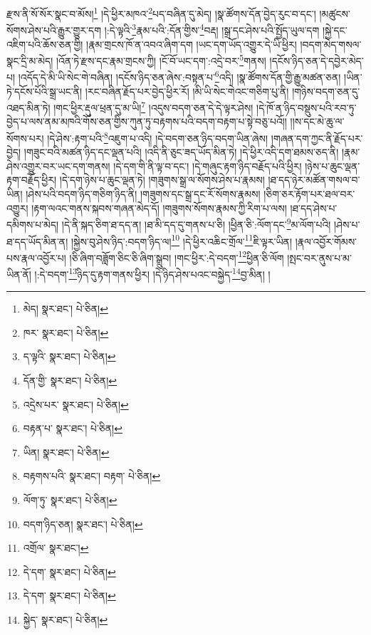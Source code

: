 རྫས་ནི་སོ་སོར་སྣང་བ་མོས།\footnote{མེད།  སྣར་ཐང་།  པེ་ཅིན། } །དེ་ཕྱིར་མཁའ་\footnote{ཁར་  སྣར་ཐང་།  པེ་ཅིན། }པད་བཞིན་དུ་མེད། །སྣ་ཚོགས་དོན་བྱེད་རུང་བ་དང་། །མཚུངས་སོགས་ཤེས་པའི་རྒྱུར་གྱུར་དག །:དེ་ལྟའི་\footnote{ད་ལྟའི་  སྣར་ཐང་།  པེ་ཅིན། }རྣམ་པའི་:དོན་གྱིས་\footnote{དོན་གྱི་  སྣར་ཐང་།  པེ་ཅིན། }བརྡ། །སྒྲ་དང་ཤེས་པའི་སྤྱོད་ཡུལ་དག །སྐྱེ་དང་འཇིག་པའི་ཆོས་ཅན་གྱི། །རྣམ་གྲངས་ཁོ་ན་འབའ་ཞིག་དག །ཡང་དག་ཡོད་འགྱུར་དེ་ཡི་ཕྱིར། །བདག་མེད་གསལ་སྣང་དྲི་མ་མེད། །འོན་ཏེ་རྫས་དང་རྣམ་གྲངས་ཀྱི། །ངོ་བོ་ཡང་དག་:འདྲེ་བར་\footnote{འདྲེས་པར་  སྣར་ཐང་།  པེ་ཅིན། }གནས། །དངོས་ཉིད་ཅན་དེ་དབྱེར་མེད་པ། །འདོད་དེ་མི་ཡི་སེང་གེ་བཞིན། །དངོས་ཉིད་ཅན་ཞེས་:བསྟན་པ་\footnote{བརྟན་པ་  སྣར་ཐང་།  པེ་ཅིན། }འདི། །སྣ་ཚོགས་དོན་གྱི་རྒྱུ་མཚན་ཅན། །ཡིན་ཏེ་དངོས་པོའི་སྒྲ་ཡང་ནི། །རང་བཞིན་རྗོད་པར་བྱེད་ཕྱིར་རོ། །མི་ཡི་སེང་གེའང་གཅིག་པུ་ནི། །གཉིས་བདག་ཅན་དུ་འཐད་མིན་ཏེ། །གང་ཕྱིར་རྡུལ་ཕྲན་དུ་མ་ཡི།\footnote{ཡིན།  སྣར་ཐང་།  པེ་ཅིན། } །འདུས་བདག་ཅན་དེ་དེ་ལྟར་ཤེས། །དེ་ཁོ་ན་ཉིད་བསྡུས་པའི་རབ་ཏུ་བྱེད་པ་ལས་ནམ་མཁའི་གོས་ཅན་གྱིས་ཀུན་ཏུ་བརྟགས་པའི་བདག་བརྟག་པ་སྟེ་བཅུ་པའོ།། །།ས་དང་མེ་ཆུ་ལ་སོགས་པར། །དེ་ཤེས་:རྟག་པའི་\footnote{བརྟགས་པའི་  སྣར་ཐང་། བརྟག་  པེ་ཅིན། }འཇུག་པ་འདི། །དེ་བདག་ཅན་ཉིད་བདག་ཡིན་ཞེས། །གཞན་དག་ཀྱང་ནི་རྗོད་པར་བྱེད། །གཟུང་བའི་མཚན་ཉིད་དང་ལྡན་པའི། །འདི་ནི་ཅུང་ཟད་ཡོད་མིན་ཏེ། །དེ་ཕྱིར་འདི་དག་ཐམས་ཅད་ནི། །རྣམ་ཤེས་འགྱུར་བར་ཡང་དག་གནས། །དེ་དག་གི་ནི་ལྟ་བ་དང་། །དེ་གཞུང་རྟག་ཉིད་བརྗོད་པའི་ཕྱིར། །ཉེས་པ་ཆུང་ལྡན་རྟག་བརྗོད་ཕྱིར། །དེ་དག་ཉེས་པ་ཆུང་ལྡན་ཏེ། །གཟུགས་སྒྲ་ལ་སོགས་ཤེས་པ་རྣམས། །ཐ་དད་ཉེར་མཚོན་གསལ་བ་ཡིན། །ཤེས་པའི་བདག་ཉིད་གཅིག་ཉིད་ནི། །གཟུགས་དང་སྒྲ་དང་རོ་སོགས་རྣམས། །ཅིག་ཅར་རྟོག་པར་ཐལ་བར་འགྱུར། །རྟག་ལའང་གནས་སྐབས་གཞན་མེད་དོ། །གཟུགས་སོགས་རྣམས་ཀྱི་རིག་པ་ལས། །ཐ་དད་ཤེས་པ་དམིགས་པ་མེད། །དེ་ནི་སྐད་ཅིག་ཐ་དད་ན། །ཐ་མི་དད་དུ་གནས་པ་ཅི། །ཕྱིན་ཅི་:ལོག་དང་\footnote{ལོག་ཏུ་  སྣར་ཐང་།  པེ་ཅིན། }མ་ལོག་པའི། །ཤེས་པ་ཐ་དད་ཡོད་མིན་ན། །སྐྱེས་བུ་ཤེས་ཉིད་:བདག་ཉིད་ལ།\footnote{བདག་ཉིད་ཅན།  སྣར་ཐང་།  པེ་ཅིན། } །དེ་ཕྱིར་འཆིང་གྲོལ་\footnote{འགྲོལ་  སྣར་ཐང་། }ཇི་ལྟར་ཡིན། །རྣལ་འབྱོར་གོམས་པས་རྣལ་འབྱོར་པ། །ཅི་ཞིག་བཟློག་ཅིང་ཅི་ཞིག་སྒྲུབ། །གང་ཕྱིར་:དེ་བདག་\footnote{དེ་དག་  སྣར་ཐང་།  པེ་ཅིན། }ཕྱིན་ཅི་ལོག །སྤང་བར་ནུས་པ་མ་ཡིན་ནོ། །:དེ་བདག་\footnote{དེ་དག་  སྣར་ཐང་།  པེ་ཅིན། }ཉིད་དུ་རྟག་གནས་ཕྱིར། །དེ་ཉིད་ཤེས་པའང་བསྐྱེད་\footnote{སྐྱེད་  སྣར་ཐང་།  པེ་ཅིན། }བྱ་མིན། །
